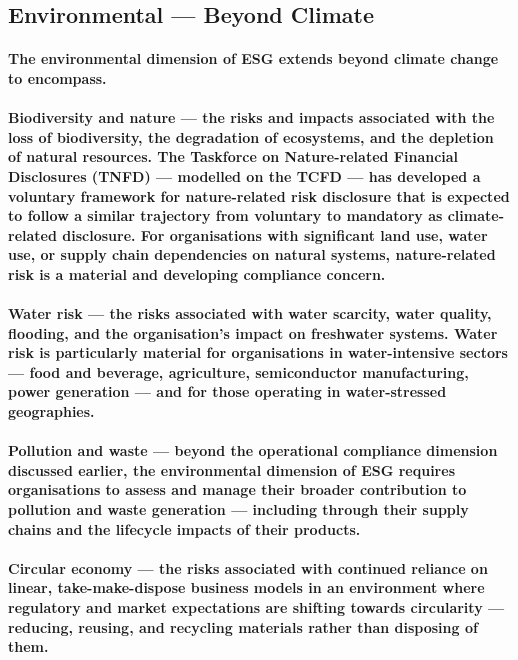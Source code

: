 \subsection{Environmental — Beyond Climate}
\paragraph{The environmental dimension of ESG extends beyond climate change to encompass.}
\paragraph{\textbf{Biodiversity and nature} — the risks and impacts associated with the loss of biodiversity, the degradation of ecosystems, and the depletion of natural resources. The Taskforce on Nature-related Financial Disclosures (TNFD) — modelled on the TCFD — has developed a voluntary framework for nature-related risk disclosure that is expected to follow a similar trajectory from voluntary to mandatory as climate-related disclosure. For organisations with significant land use, water use, or supply chain dependencies on natural systems, nature-related risk is a material and developing compliance concern.}
\paragraph{\textbf{Water risk} — the risks associated with water scarcity, water quality, flooding, and the organisation's impact on freshwater systems. Water risk is particularly material for organisations in water-intensive sectors — food and beverage, agriculture, semiconductor manufacturing, power generation — and for those operating in water-stressed geographies.}
\paragraph{\textbf{Pollution and waste} — beyond the operational compliance dimension discussed earlier, the environmental dimension of ESG requires organisations to assess and manage their broader contribution to pollution and waste generation — including through their supply chains and the lifecycle impacts of their products.}
\paragraph{\textbf{Circular economy} — the risks associated with continued reliance on linear, take-make-dispose business models in an environment where regulatory and market expectations are shifting towards circularity — reducing, reusing, and recycling materials rather than disposing of them.}

